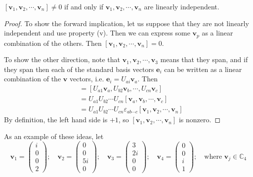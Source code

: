 \documentclass{article}
\begin{document}
\begin{proposition}
	$[ \bm v_1, \bm v_2, \cdots, \bm v_n] \neq 0$ if and only if $\bm v_1, \bm v_2, \cdots, \bm v_n$ are linearly independent.
\end{proposition}
\begin{proof}
	To show the forward implication, let us suppose that they are not linearly independent and use property (v). Then we can express some $\bm v_p$ as a linear combination of the others. Then $[\bm v_1, \bm v_2, \cdots, \bm v_n] = 0$.

	To show the other direction, note that $\bm v_1, \bm v_2, \cdots, \bm v_3$ means that they span, and if they span then each of the standard basis vectors $\bm e_i$ can be written as a linear combination of the $\bm v$ vectors, i.e. $\bm e_i = U_{ai} \bm v_a$. Then
	\begin{align*}
		[\bm e_1, \bm e_2, \cdots, \bm e_n] & = [U_{a1}\bm v_a, U_{b2}\bm v_b, \cdots, U_{cn}\bm v_c]                                 \\
		                                    & = U_{a1}U_{b2}\cdots U_{cn}[\bm v_a, \bm v_b, \cdots, \bm v_c]                          \\
		                                    & = U_{a1}U_{b2}\cdots U_{cn} \varepsilon_{ab\cdots c}[\bm v_1, \bm v_2, \cdots, \bm v_n]
	\end{align*}
	By definition, the left hand side is $+1$, so $[\bm v_1, \bm v_2, \cdots, \bm v_n]$ is nonzero.
\end{proof}
As an example of these ideas, let
\[ \bm v_1 = \begin{pmatrix} i \\ 0 \\ 0 \\ 2 \end{pmatrix};\quad\bm v_2 = \begin{pmatrix} 0 \\ 0 \\ 5i \\ 0 \end{pmatrix};\quad\bm v_3 = \begin{pmatrix} 3 \\ 2i \\ 0 \\ 0 \end{pmatrix};\quad\bm v_4 = \begin{pmatrix} 0 \\ 0 \\ i \\ 1 \end{pmatrix};\quad \text{where }\bm v_j \in \mathbb C_4 \]
\end{document}
